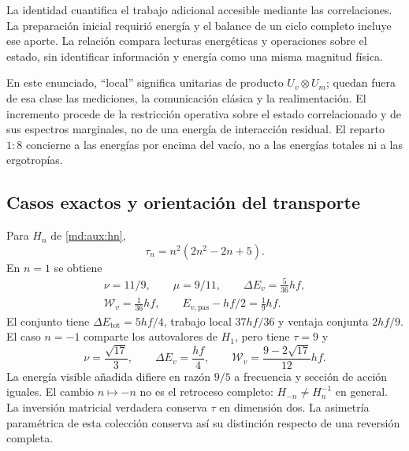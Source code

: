 La identidad cuantifica el trabajo adicional accesible
mediante las correlaciones. La preparación inicial requirió
energía y el balance de un ciclo completo incluye ese aporte.
La relación compara lecturas energéticas y operaciones sobre
el estado, sin identificar información y energía como una
misma magnitud física.

En este enunciado, ``local'' significa unitarias de producto
$U_v\otimes U_m$; quedan fuera de esa clase las mediciones,
la comunicación clásica y la realimentación. El incremento
procede de la restricción operativa sobre el estado
correlacionado y de sus espectros marginales, no de una
energía de interacción residual. El reparto $1:8$ concierne
a las energías por encima del vacío, no a las energías
totales ni a las ergotropías.

\subsection{Casos exactos y orientación del transporte}
\label{md:aux:casos-energia}

Para $H_n$ de \eqref{md:aux:hn},
\begin{equation}
 \tau_n=n^2(2n^2-2n+5).
 \label{md:aux:tau-hn}
\end{equation}
En $n=1$ se obtiene
\begin{equation}
 \begin{gathered}
 \nu=11/9,\qquad\mu=9/11,\qquad
 \Delta E_v=\frac5{36}hf,\\
 \mathcal W_v=\frac1{36}hf,\qquad
 E_{v,\mathrm{pas}}-hf/2=\frac19hf.
 \end{gathered}
 \label{md:aux:caso-positivo}
\end{equation}
El conjunto tiene $\Delta E_{\mathrm{tot}}=5hf/4$, trabajo
local $37hf/36$ y ventaja conjunta $2hf/9$.
El caso $n=-1$ comparte los autovalores de $H_1$,
pero tiene $\tau=9$ y
\begin{equation}
 \nu=\frac{\sqrt{17}}3,\qquad
 \Delta E_v=\frac{hf}{4},\qquad
 \mathcal W_v=\frac{9-2\sqrt{17}}{12}hf.
 \label{md:aux:caso-negativo}
\end{equation}
La energía visible añadida difiere en razón $9/5$ a
frecuencia y sección de acción iguales. El cambio $n\mapsto-n$
no es el retroceso completo: $H_{-n}\ne H_n^{-1}$ en general.
La inversión matricial verdadera conserva $\tau$ en
dimensión dos. La asimetría paramétrica de esta colección
conserva así su distinción respecto de una reversión completa.

